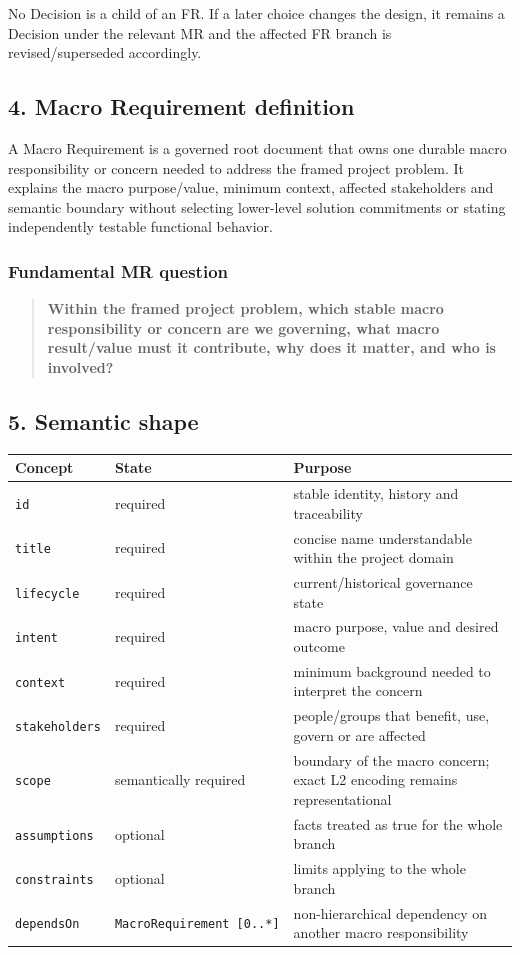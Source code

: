 \documentclass[
  10pt,
]{article}
\begin{document}
No Decision is a child of an FR. If a later choice changes the design,
it remains a Decision under the relevant MR and the affected FR branch
is revised/superseded accordingly.

\subsection{4. Macro Requirement
definition}\label{4-macro-requirement-definition}

A Macro Requirement is a governed root document that owns one durable
macro responsibility or concern needed to address the framed project
problem. It explains the macro purpose/value, minimum context, affected
stakeholders and semantic boundary without selecting lower-level
solution commitments or stating independently testable functional
behavior.

\subsubsection{Fundamental MR question}\label{fundamental-mr-question}

\begin{quote}
\textbf{Within the framed project problem, which stable macro
responsibility or concern are we governing, what macro result/value must
it contribute, why does it matter, and who is involved?}
\end{quote}

\subsection{5. Semantic shape}\label{5-semantic-shape}

\begin{longtable}[]{@{}lll@{}}
\toprule\noalign{}
Concept & State & Purpose \\
\midrule\noalign{}
\endhead
\bottomrule\noalign{}
\endlastfoot
\texttt{id} & required & stable identity, history and traceability \\
\texttt{title} & required & concise name understandable within the
project domain \\
\texttt{lifecycle} & required & current/historical governance state \\
\texttt{intent} & required & macro purpose, value and desired outcome \\
\texttt{context} & required & minimum background needed to interpret the
concern \\
\texttt{stakeholders} & required & people/groups that benefit, use,
govern or are affected \\
\texttt{scope} & semantically required & boundary of the macro concern;
exact L2 encoding remains representational \\
\texttt{assumptions} & optional & facts treated as true for the whole
branch \\
\texttt{constraints} & optional & limits applying to the whole branch \\
\texttt{dependsOn} & \texttt{MacroRequirement\ {[}0..*{]}} &
non-hierarchical dependency on another macro responsibility \\
\end{longtable}
\end{document}
